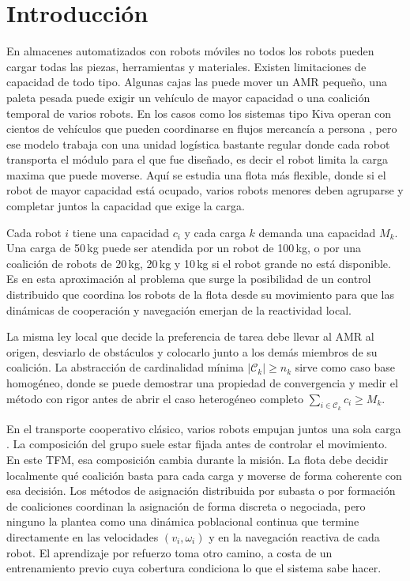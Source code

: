\section{Introducción}
\label{sec:intro}

En almacenes automatizados con robots móviles no todos los robots pueden cargar todas las piezas, herramientas y materiales. Existen limitaciones de capacidad de todo tipo.
Algunas cajas las puede mover un AMR pequeño, una paleta pesada puede exigir un vehículo de mayor
capacidad o una coalición temporal de varios robots. En los casos como los sistemas tipo Kiva operan
con cientos de vehículos que pueden coordinarse en flujos mercancía a persona
\citep{wurman2008coordinating}, pero ese modelo trabaja con una unidad logística bastante
regular donde cada robot transporta el módulo para el que fue diseñado, es decir el robot limita la carga maxima que puede moverse.
Aquí se estudia una flota más flexible, donde si el robot de mayor capacidad está ocupado, varios robots menores
deben agruparse y completar juntos la capacidad que exige la carga.

Cada robot $i$ tiene una capacidad $c_i$ y cada carga $k$
demanda una capacidad $M_k$. Una carga de 50\,kg puede ser atendida por un robot de
100\,kg, o por una coalición de robots de 20\,kg, 20\,kg y 10\,kg si el robot grande no
está disponible. Es en esta aproximación al problema que surge la posibilidad de un control distribuido que coordina los robots de la flota desde su movimiento para que las dinámicas de cooperación y navegación emerjan de la reactividad local.

La misma ley local que decide la preferencia de tarea debe llevar al AMR al origen, desviarlo de obstáculos
y colocarlo junto a los demás miembros de su coalición.
La abstracción de cardinalidad mínima $|\mathcal{C}_k|\geq n_k$ sirve como caso base
homogéneo, donde se puede demostrar una propiedad de convergencia y medir el método con
rigor antes de abrir el caso heterogéneo completo $\sum_{i\in\mathcal{C}_k}c_i\geq M_k$.

En el transporte cooperativo clásico, varios robots empujan juntos una sola carga
\citep{ebel2024cooperative, rosenfelder2024force}. La composición del grupo suele estar
fijada antes de controlar el movimiento. En este TFM, esa composición cambia durante la
misión. La flota debe decidir localmente qué coalición basta para cada carga y moverse
de forma coherente con esa decisión. Los métodos de asignación distribuida por subasta
\citep{choi2009consensus} o por formación de coaliciones
\citep{dutta2021hedonic, shan2024distributed} coordinan la asignación de forma discreta
o negociada, pero ninguno la plantea como una dinámica poblacional continua que termine
directamente en las velocidades $(v_i,\omega_i)$ y en la navegación reactiva de cada
robot. El aprendizaje por refuerzo \citep{bezerra2025learning} toma otro camino, a costa de un
entrenamiento previo cuya cobertura condiciona lo que el sistema sabe hacer.

